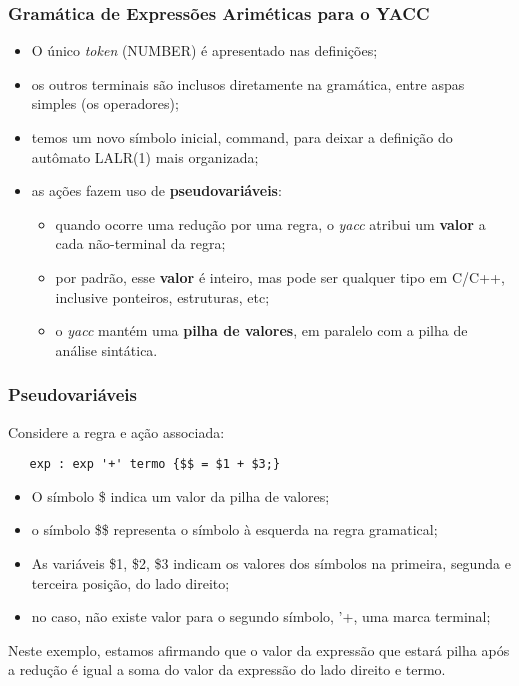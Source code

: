 \documentclass[table]{beamer}
\begin{document}
\begin{frame}
   \frametitle{Gramática de Expressões Ariméticas para o YACC}
   \begin{itemize}
      \item O único \textit{token} (NUMBER) é apresentado nas definições;
      \item os outros terminais são inclusos diretamente na gramática, entre aspas simples (os operadores);
      \item temos um novo símbolo inicial, \textsf{command}, para deixar a definição do autômato LALR(1) mais organizada;
      \item as ações fazem uso de \textbf{pseudovariáveis}:
      \begin{itemize}
         \item quando ocorre uma redução por uma regra, o \textit{yacc} atribui um \textbf{valor} a cada não-terminal da regra;
         \item por padrão, esse \textbf{valor} é inteiro, mas pode ser qualquer tipo em C/C++, inclusive ponteiros, estruturas, etc;
         \item o \textit{yacc} mantém uma \textbf{pilha de valores}, em paralelo com a pilha de análise sintática.
      \end{itemize}
   \end{itemize}
\end{frame}

\begin{frame}[fragile]
   \frametitle{Pseudovariáveis}
   Considere a regra e ação associada:
   \begin{verbatim}
   exp : exp '+' termo {$$ = $1 + $3;}
   \end{verbatim}
   \begin{itemize}
      \item O símbolo \$ indica um valor da pilha de valores;
      \item o símbolo \$\$ representa o símbolo à esquerda na regra gramatical;
      \item As variáveis \$1, \$2, \$3 indicam os valores dos símbolos na primeira, segunda e terceira posição, do lado direito;
      \item no caso, não existe valor para o segundo símbolo, '+, uma marca terminal;
   \end{itemize}
   Neste exemplo, estamos afirmando que o valor da expressão que estará pilha após a redução é igual a soma do valor da expressão do lado direito e termo.
\end{frame}
\end{document}
